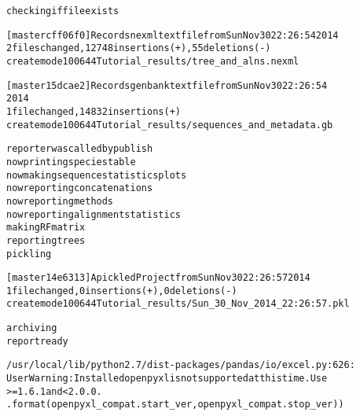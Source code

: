 \documentclass[letterpaper,10pt,english]{/usr/share/sphinx/texinputs/sphinxhowto}
\newenvironment{InvisibleVerbatim}
        {\begin{mdframed}[leftmargin=0.1\linewidth,innerleftmargin=3pt,innerrightmargin=3pt, userdefinedwidth=1\linewidth, linewidth=0pt, linecolor=white, usetwoside=false]}
        {\end{mdframed}}
\begin{document}
                \begin{InvisibleVerbatim}
                \vspace{-0.5\baselineskip}
\begin{alltt}checking if file exists



[master cff06f0] Records nexml text file from Sun Nov 30 22:26:54 2014
 2 files changed, 12748 insertions(+), 55 deletions(-)
 create mode 100644 Tutorial\_results/tree\_and\_alns.nexml




[master 15dcae2] Records genbank text file from Sun Nov 30 22:26:54
2014
 1 file changed, 14832 insertions(+)
 create mode 100644 Tutorial\_results/sequences\_and\_metadata.gb

reporter was called by publish
now printing species table
now making sequence statistics plots
now reporting concatenations
now reporting methods
now reporting alignment statistics
making RF matrix
reporting trees
pickling

[master 14e6313] A pickled Project from Sun Nov 30 22:26:57 2014
 1 file changed, 0 insertions(+), 0 deletions(-)
 create mode 100644 Tutorial\_results/Sun\_30\_Nov\_2014\_22:26:57.pkl

archiving
report ready
\end{alltt}

            \end{InvisibleVerbatim}
            
                \begin{InvisibleVerbatim}
                \vspace{-0.5\baselineskip}
\begin{alltt}/usr/local/lib/python2.7/dist-packages/pandas/io/excel.py:626:
UserWarning: Installed openpyxl is not supported at this time. Use
>=1.6.1 and <2.0.0.
  .format(openpyxl\_compat.start\_ver, openpyxl\_compat.stop\_ver))
\end{alltt}

            \end{InvisibleVerbatim}
            
        
    


\end{document}
